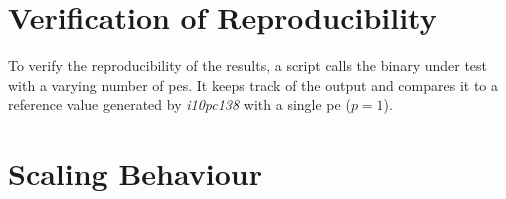 \section{Verification of Reproducibility}
\label{sec:VerificationOfReproducibility}
To verify the reproducibility of the results, a script calls the binary under test with a varying number of \glspl{pe}.
It keeps track of the output and compares it to a reference value generated by \textit{i10pc138} with a single \gls{pe} ($p=1$).


\section{Scaling Behaviour}
\label{sec:ScalingBehaviour}